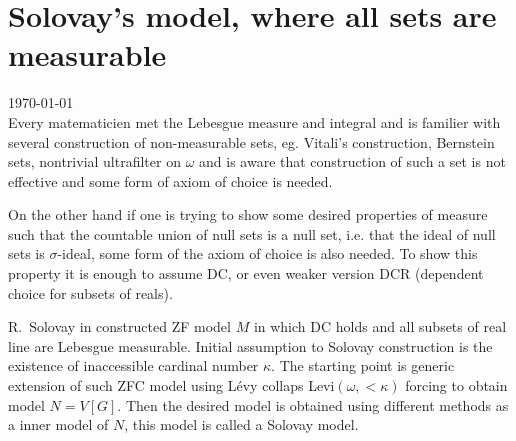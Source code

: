 \cfoot{}\rhead{\thepage}

%


\thispagestyle{empty}

\section{Solovay's model, where all sets are measurable}\label{solovay_chapter}

{\tiny \today } \\[0.5cm]

Every matematicien met the Lebesgue measure and integral and is
familier with several construction of non-measurable sets, eg.
Vitali's construction, Bernstein sets, nontrivial ultrafilter
on $\omega$ and is aware that construction of such a set is
not effective and some form of axiom of choice is needed.

On the other hand if one is trying to show some desired properties
of measure such that the countable union of null sets is a null set,
i.e. that the ideal of null sets is $\sigma$-ideal, some form
of the axiom of choice is also needed. To show this property
it is enough to assume DC, or even weaker version DCR (dependent
choice for subsets of reals).

R.~Solovay in \cite{Sol:1970} constructed ZF model $M$ in which
DC holds and all subsets of real line are Lebesgue measurable.
Initial assumption to Solovay construction is the existence of
inaccessible cardinal number $\kappa$. The starting point is
generic extension of such ZFC model using L{\' e}vy collaps
Levi$(\omega,<\kappa)$ forcing to  obtain model $N = V[G]$.
Then the desired model is obtained using different methods
as a inner model of $N$, this model is called a Solovay model.

